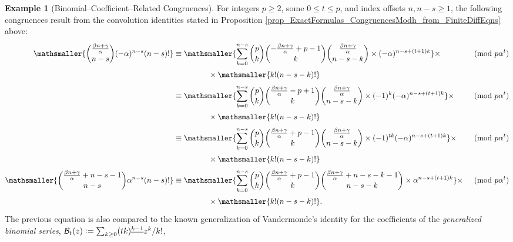 \documentclass[12pt,reqno]{article}
\numberwithin{sfootnote}{section}
\numberwithin{equation}{section}
\theoremstyle{DefaultTheoremStyle}
\theoremstyle{definition}
\newtheorem{example}[theorem]{Example}
\newcommand{\defequals}{\ensuremath{\vcentcolon=}}
\newcommand{\FFactII}[2]{\ensuremath{#1^{\underline{#2}}}}
\begin{document}
\begin{example}[Binomial--Coefficient--Related Congruences] 
For integers $p \geq 2$, 
some $0 \leq t \leq p$, and index offsets $n, n-s \geq 1$, the 
following congruences result from the convolution identities stated in 
Proposition \ref{prop_ExactFormulas_CongruencesModh_from_FiniteDiffEqns}
above: 
\begin{align*} 
\mathsmaller{ \binom{\frac{\beta n+\gamma}{\alpha}}{n-s} (-\alpha)^{n-s} (n-s)! } 
     & \equiv 
     \mathsmaller{ 
     \sum\limits_{k=0}^{n-s} 
     \binom{p}{k} 
     \binom{-\frac{\beta n+\gamma}{\alpha}+p-1}{k} 
     \binom{\frac{\beta n+\gamma}{\alpha}}{n-s-k} \times 
     (-\alpha)^{n-s+(t+1) k} 
     } \times && \pmod{p \alpha^{t}} \\ 
     & \phantom{\equiv \sum \qquad} \times 
     \mathsmaller{ 
     k! (n-s-k)! 
     } && \\ 
     & \equiv 
     \mathsmaller{ 
     \sum\limits_{k=0}^{n-s} 
     \binom{p}{k} 
     \binom{\frac{\beta n+\gamma}{\alpha}-p+1}{k} 
     \binom{\frac{\beta n+\gamma}{\alpha}}{n-s-k} \times 
     (-1)^{k} (-\alpha)^{n-s+(t+1) k} 
     } \times && \pmod{p \alpha^{t}} \\ 
     & \phantom{\equiv \sum \qquad} \times 
     \mathsmaller{ 
     k! (n-s-k)! 
     } && \\ 
     & \equiv 
     \mathsmaller{ 
     \sum\limits_{k=0}^{n-s} 
     \binom{p}{k} 
     \binom{\frac{\beta n+\gamma}{\alpha}+p-1}{k} 
     \binom{\frac{\beta n+\gamma}{\alpha}}{n-s-k} \times 
     (-1)^{tk} (-\alpha)^{n-s+(t+1) k} 
     } \times && \pmod{p \alpha^{t}} \\ 
     & \phantom{\equiv \sum \qquad} \times 
     \mathsmaller{ 
     k! (n-s-k)! 
     } && \\ 
\mathsmaller{ 
\binom{\frac{\beta n+\gamma}{\alpha}+n-s-1}{n-s} \alpha^{n-s} (n-s)! 
} 
     & \equiv 
     \mathsmaller{ 
     \sum\limits_{k=0}^{n-s} 
     \binom{p}{k} 
     \binom{\frac{\beta n+\gamma}{\alpha}+p-1}{k} 
     \binom{\frac{\beta n+\gamma}{\alpha}+n-s-k-1}{n-s-k} \times 
     \alpha^{n-s+(t+1) k} 
     } \times && \pmod{p \alpha^{t}} \\ 
     & \phantom{\equiv \sum \qquad} \times 
     \mathsmaller{ 
     k! (n-s-k)! 
     }. && 
\end{align*} 
The previous equation is also compared to the known generalization of 
Vandermonde's identity for the coefficients of the 
\emph{generalized binomial series}, 
$\mathcal{B}_t(z) \defequals \sum_{k \geq 0} \FFactII{(tk)}{k-1} z^k / k!$, 

\end{example}
\end{document}
